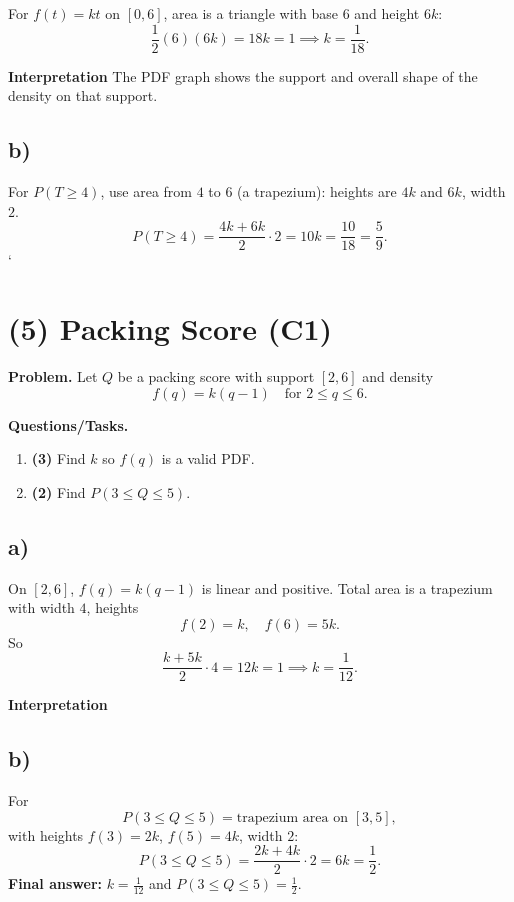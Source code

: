 For $f(t)=kt$ on $[0,6]$, area is a triangle with base $6$ and height $6k$:
\[
\frac12(6)(6k)=18k=1\implies k=\frac1{18}.
\]

\textbf{Interpretation}
The PDF graph shows the support and overall shape of the density on that support.

\subsection*{b)}
For $P(T\ge4)$, use area from $4$ to $6$ (a trapezium): heights are $4k$ and $6k$, width $2$.
\[
P(T\ge4)=\frac{4k+6k}{2}\cdot2=10k=\frac{10}{18}=\frac59.
\]
`
\section{(5) Packing Score (C1)}

\textbf{Problem.}
Let $Q$ be a packing score with support $[2,6]$ and density
\[
f(q)=k(q-1)\quad\text{for }2\le q\le 6.
\]

\textbf{Questions/Tasks.}
\begin{enumerate}[label=\textbf{\alph*)}]
	\item \textbf{(3)} Find $k$ so $f(q)$ is a valid PDF.
	\item \textbf{(2)} Find $P(3\le Q\le 5)$.
\end{enumerate}

\subsection*{a)}

On $[2,6]$, $f(q)=k(q-1)$ is linear and positive. Total area is a trapezium with width $4$, heights
\[
f(2)=k,\quad f(6)=5k.
\]
So
\[
\frac{k+5k}{2}\cdot4=12k=1\implies k=\frac1{12}.
\]

\textbf{Interpretation}

\subsection*{b)}
For
\[
P(3\le Q\le5)=\text{trapezium area on }[3,5],
\]
with heights $f(3)=2k$, $f(5)=4k$, width $2$:
\[
P(3\le Q\le5)=\frac{2k+4k}{2}\cdot2=6k=\frac12.
\]
\textbf{Final answer:} $k=\frac1{12}$ and $P(3\le Q\le5)=\frac12$.

